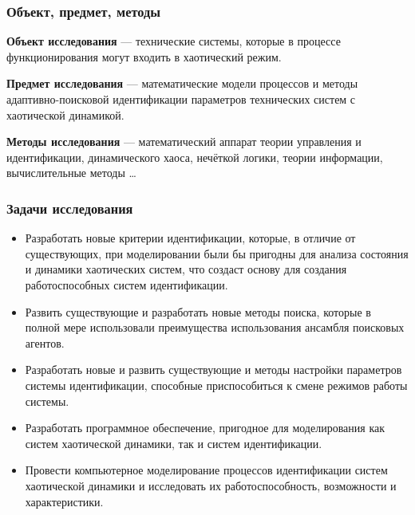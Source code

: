 \documentclass[14pt,handout,utf8]{beamer}
\begin{document}

\begin{frame}
  \frametitle{Объект, предмет, методы}

\textbf{Объект исследования} ---
технические системы, которые в процессе функционирования
могут входить в хаотический режим.

\medskip

\textbf{Предмет исследования} ---
математические модели процессов и методы
адаптивно-поисковой идентификации параметров технических систем с хаотической динамикой.

\medskip

\textbf{Методы исследования} ---
математический аппарат теории управления и идентификации,
динамического хаоса,
нечёткой логики,
теории информации,
вычислительные методы
\ldots

\end{frame}




\begin{frame}
  \frametitle{Задачи исследования}

  \begin{itemize}

    \item
      Разработать новые критерии идентификации, которые, в отличие от существующих,
      при моделировании были бы пригодны для анализа состояния и динамики хаотических
      систем, что создаст основу для создания работоспособных систем идентификации.

    \item
      Развить существующие и разработать новые методы поиска, которые в полной мере
      использовали преимущества использования ансамбля поисковых агентов.

    \item
      Разработать новые и развить существующие и  методы настройки параметров системы
      идентификации, способные приспособиться к смене режимов работы системы.

    \item
      Разработать программное обеспечение, пригодное для моделирования как систем
      хаотической динамики, так и систем идентификации.

    \item
      Провести компьютерное моделирование процессов идентификации систем хаотической
      динамики и исследовать их работоспособность, возможности и характеристики.

  \end{itemize}

\end{frame}
\end{document}

